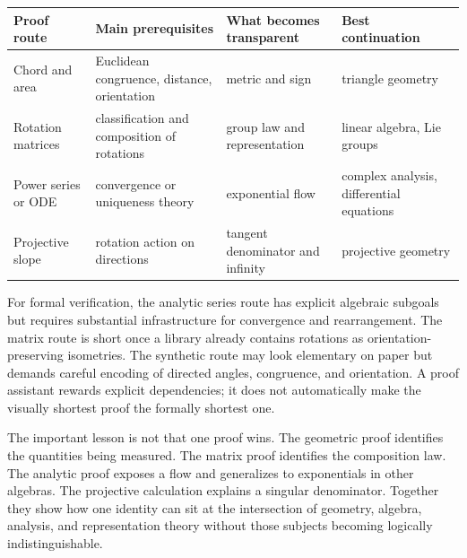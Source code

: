 \begin{center}
\small
\begin{tabularx}{\textwidth}{@{}lYYY@{}}
\toprule
Proof route & Main prerequisites & What becomes transparent & Best continuation\\
\midrule
Chord and area & Euclidean congruence, distance, orientation & metric and sign & triangle geometry\\
Rotation matrices & classification and composition of rotations & group law and representation & linear algebra, Lie groups\\
Power series or ODE & convergence or uniqueness theory & exponential flow & complex analysis, differential equations\\
Projective slope & rotation action on directions & tangent denominator and infinity & projective geometry\\
\bottomrule
\end{tabularx}
\end{center}

For formal verification, the analytic series route has explicit algebraic subgoals but requires substantial infrastructure for convergence and rearrangement.  The matrix route is short once a library already contains rotations as orientation-preserving isometries.  The synthetic route may look elementary on paper but demands careful encoding of directed angles, congruence, and orientation.  A proof assistant rewards explicit dependencies; it does not automatically make the visually shortest proof the formally shortest one.

The important lesson is not that one proof wins.  The geometric proof identifies the quantities being measured.  The matrix proof identifies the composition law.  The analytic proof exposes a flow and generalizes to exponentials in other algebras.  The projective calculation explains a singular denominator.  Together they show how one identity can sit at the intersection of geometry, algebra, analysis, and representation theory without those subjects becoming logically indistinguishable.
